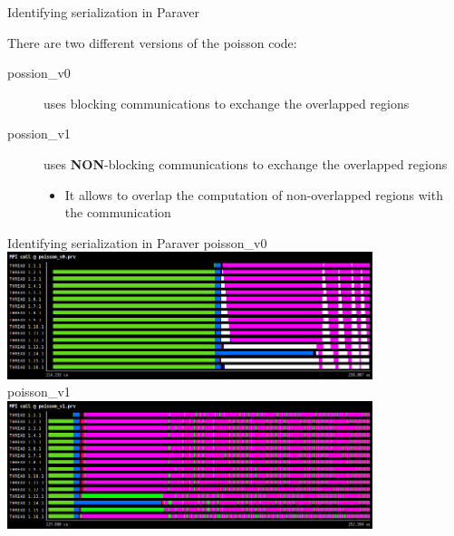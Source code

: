 \documentclass[10pt,xcolor=table]{beamer}
\begin{document}
\begin{frame}{Identifying serialization in Paraver}

There are two different versions of the poisson code:

\begin{description}
\item[possion\_v0] uses blocking communications to exchange the overlapped regions
\item[possion\_v1] uses {\bf NON}-blocking communications to exchange the overlapped regions
    \begin{itemize}
        \item It allows to overlap the computation of non-overlapped regions with the communication
    \end{itemize}
\end{description}
    
\end{frame}
\begin{frame}{Identifying serialization in Paraver}
\centering
poisson\_v0\\
\includegraphics[width=0.8\textwidth]{figs/MPI_call@poisson_v0.png}\\
poisson\_v1\\
\includegraphics[width=0.8\textwidth]{figs/MPI_call@poisson_v1.png}\\
\end{frame}
\end{document}
